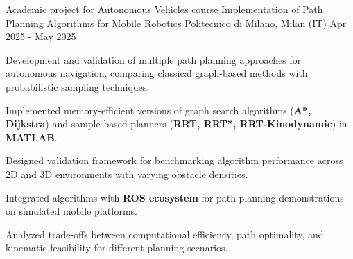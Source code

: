 
\cventry
{Academic project for Autonomous Vehicles course}
{Implementation of Path Planning Algorithms for Mobile Robotics}
{Politecnico di Milano, Milan (IT)}
{Apr 2025 - May 2025}
{
    Development and validation of multiple path planning approaches for autonomous navigation, comparing classical graph-based methods with probabilistic sampling techniques.
    \newline
    \vspace{4mm}
    \begin{cvitems}
        \item {Implemented memory-efficient versions of graph search algorithms (\textbf{A*, Dijkstra}) and sample-based planners (\textbf{RRT, RRT*, RRT-Kinodynamic}) in \textbf{MATLAB}.}
        \item {Designed validation framework for benchmarking algorithm performance across 2D and 3D environments with varying obstacle densities.}
        \item {Integrated algorithms with \textbf{ROS ecosystem} for path planning demonstrations on simulated mobile platforms.}
        \item {Analyzed trade-offs between computational efficiency, path optimality, and kinematic feasibility for different planning scenarios.}
    \end{cvitems}
}
